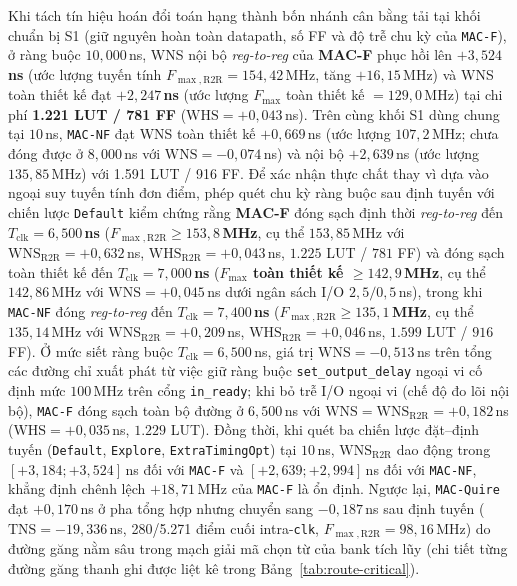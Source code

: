 Khi tách tín hiệu hoán đổi toán hạng thành bốn nhánh cân bằng tải tại khối chuẩn
bị S1 (giữ nguyên hoàn toàn datapath, số FF và độ trễ chu kỳ của \texttt{MAC-F}),
ở ràng buộc $10{,}000$\,ns, WNS nội bộ \textit{reg-to-reg} của \textbf{MAC-F} phục hồi
lên \textbf{$+3{,}524$\,ns} (ước lượng tuyến tính $F_{\max,\mathrm{R2R}} = 154{,}42$\,MHz,
tăng $+16{,}15$\,MHz) và WNS toàn thiết kế đạt \textbf{$+2{,}247$\,ns} (ước lượng
$F_{\max}$ toàn thiết kế $= 129{,}0$\,MHz) tại chi phí \textbf{1.221 LUT / 781 FF}
($\mathrm{WHS}=+0{,}043$\,ns). Trên cùng khối S1 dùng chung tại $10$\,ns, \texttt{MAC-NF}
đạt WNS toàn thiết kế $+0{,}669$\,ns (ước lượng $107{,}2$\,MHz; chưa đóng được ở
$8{,}000$\,ns với $\mathrm{WNS}=-0{,}074$\,ns) và nội bộ $+2{,}639$\,ns (ước lượng
$135{,}85$\,MHz) với 1.591 LUT / 916 FF. Để xác nhận thực chất thay vì dựa vào
ngoại suy tuyến tính đơn điểm, phép quét chu kỳ ràng buộc sau định tuyến với chiến
lược \texttt{Default} kiểm chứng rằng \textbf{MAC-F} đóng sạch định thời \textit{reg-to-reg}
đến \textbf{$T_{\mathrm{clk}}=6{,}500$\,ns} (\textbf{$F_{\max,\mathrm{R2R}} \ge 153{,}8$\,MHz},
cụ thể $153{,}85$\,MHz với $\mathrm{WNS}_{\mathrm{R2R}}=+0{,}632$\,ns,
$\mathrm{WHS}_{\mathrm{R2R}}=+0{,}043$\,ns, $1.225$ LUT / $781$ FF) và đóng sạch toàn
thiết kế đến \textbf{$T_{\mathrm{clk}}=7{,}000$\,ns} (\textbf{$F_{\max}$ toàn thiết kế
$\ge 142{,}9$\,MHz}, cụ thể $142{,}86$\,MHz với $\mathrm{WNS}=+0{,}045$\,ns dưới
ngân sách I/O $2{,}5/0{,}5$\,ns), trong khi \texttt{MAC-NF} đóng \textit{reg-to-reg} đến
\textbf{$T_{\mathrm{clk}}=7{,}400$\,ns} (\textbf{$F_{\max,\mathrm{R2R}} \ge 135{,}1$\,MHz},
cụ thể $135{,}14$\,MHz với $\mathrm{WNS}_{\mathrm{R2R}}=+0{,}209$\,ns,
$\mathrm{WHS}_{\mathrm{R2R}}=+0{,}046$\,ns, $1.599$ LUT / $916$ FF). Ở mức siết
ràng buộc $T_{\mathrm{clk}}=6{,}500$\,ns, giá trị $\mathrm{WNS}=-0{,}513$\,ns
trên tổng các đường chỉ xuất phát từ việc giữ ràng buộc \texttt{set\_output\_delay}
ngoại vi cố định mức $100$\,MHz trên cổng \texttt{in\_ready}; khi bỏ trễ I/O ngoại vi
(chế độ đo lõi nội bộ), \texttt{MAC-F} đóng sạch toàn bộ đường ở $6{,}500$\,ns với
$\mathrm{WNS}=\mathrm{WNS}_{\mathrm{R2R}}=+0{,}182$\,ns ($\mathrm{WHS}=+0{,}035$\,ns,
$1.229$ LUT). Đồng thời, khi quét ba chiến lược đặt--định tuyến (\texttt{Default},
\texttt{Explore}, \texttt{ExtraTimingOpt}) tại $10$\,ns, $\mathrm{WNS}_{\mathrm{R2R}}$
dao động trong $[+3{,}184; +3{,}524]$\,ns đối với \texttt{MAC-F} và $[+2{,}639; +2{,}994]$\,ns
đối với \texttt{MAC-NF}, khẳng định chênh lệch $+18{,}71$\,MHz của \texttt{MAC-F} là
ổn định.
Ngược lại, \texttt{MAC-Quire} đạt $+0{,}170$\,ns ở pha tổng hợp nhưng chuyển sang
$-0{,}187$\,ns sau định tuyến ($\mathrm{TNS}=-19{,}336$\,ns, 280/5.271 điểm cuối
intra-\texttt{clk}, $F_{\max,\mathrm{R2R}}=98{,}16$\,MHz) do đường găng nằm sâu
trong mạch giải mã chọn từ của bank tích lũy (chi tiết từng đường găng thanh ghi
được liệt kê trong Bảng~\ref{tab:route-critical}).

